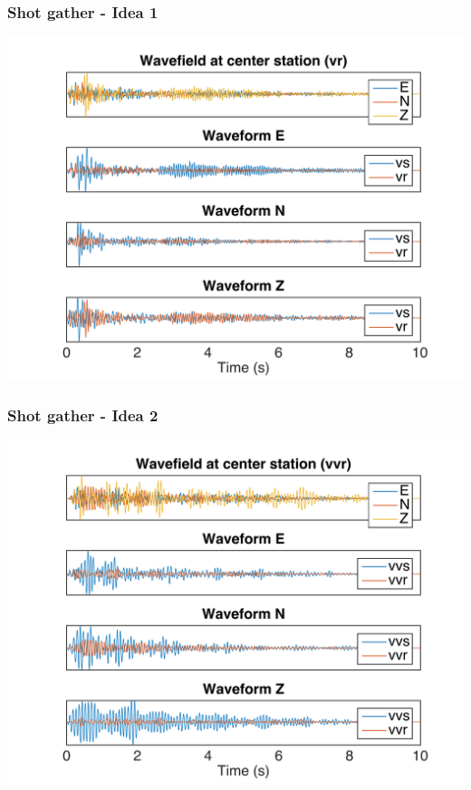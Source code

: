 \documentclass{beamer}
\begin{document}
%                                                                                              
\frame
{
\frametitle{{\bf Shot gather - Idea 1}}
\centering
\includegraphics[width=\textwidth]{../pics/C-26-78/vr.png}
}
%                                                                                              
\frame
{
\frametitle{{\bf Shot gather - Idea 2}}
\centering
\includegraphics[width=\textwidth]{../pics/C-78-405/vvr.png}
}
\end{document}
